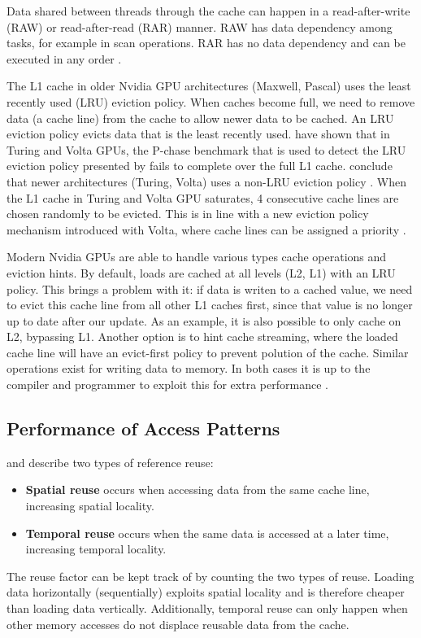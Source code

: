 Data shared between threads through the cache can happen in a read-after-write (RAW) or read-after-read (RAR) manner.
RAW has data dependency among tasks, for example in scan operations.
RAR has no data dependency and can be executed in any order \cite{tripathy2021paver}.

The L1 cache in older Nvidia GPU architectures (Maxwell, Pascal) uses the least recently used (LRU) eviction policy.
When caches become full, we need to remove data (a cache line) from the cache to allow newer data to be cached.
An LRU eviction policy evicts data that is the least recently used.
\citet{jia2019dissecting} have shown that in Turing and Volta GPUs, the P-chase benchmark that is used to detect the LRU eviction policy presented by \citet{mei2016dissecting} fails to complete over the full L1 cache.
\citeauthor{jia2019dissecting} conclude that newer architectures (Turing, Volta) uses a non-LRU eviction policy \cite{jia2019dissecting, jia2018dissecting,mei2016dissecting}.
When the L1 cache in Turing and Volta GPU saturates, 4 consecutive cache lines are chosen randomly to be evicted.
This is in line with a new eviction policy mechanism introduced with Volta, where cache lines can be assigned a priority \cite{jia2019dissecting,nvidia2021cudadocs}.

Modern Nvidia GPUs are able to handle various types cache operations and eviction hints.
By default, loads are cached at all levels (L2, L1) with an LRU policy.
This brings a problem with it: if data is writen to a cached value, we need to evict this cache line from all other L1 caches first, since that value is no longer up to date after our update.
As an example, it is also possible to only cache on L2, bypassing L1.
Another option is to hint cache streaming, where the loaded cache line will have an evict-first policy to prevent polution of the cache.
Similar operations exist for writing data to memory.
In both cases it is up to the compiler and programmer to exploit this for extra performance \cite{nvidia2021cudadocs}.

\subsection{Performance of Access Patterns}
\citeauthor{lam1991cache} and \citeauthor{meyer2003algorithms} describe two types of reference reuse\cite{lam1991cache, meyer2003algorithms}:
\begin{itemize}
    \item \textbf{Spatial reuse} occurs when accessing data from the same cache line, increasing spatial locality.
    \item \textbf{Temporal reuse} occurs when the same data is accessed at a later time, increasing temporal locality.
\end{itemize}
The reuse factor can be kept track of by counting the two types of reuse.
Loading data horizontally (sequentially) exploits spatial locality and is therefore cheaper than loading data vertically.
Additionally, temporal reuse can only happen when other memory accesses do not displace reusable data from the cache.

